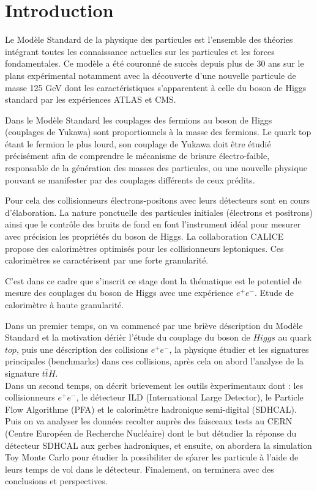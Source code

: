 \section*{Introduction} %

Le Mod\`ele Standard de la physique des particules est l’ensemble des th\'eories int\'egrant toutes les connaissance actuelles sur les particules et les forces fondamentales. Ce mod\`ele a \'et\'e couronn\'e de succ\`es depuis plus de 30 ans sur le plans exp\'erimental notamment avec la d\'ecouverte d'une nouvelle particule de masse 125 GeV dont les caract\'eristiques s'apparentent \`a celle du boson de Higgs standard par les exp\'eriences ATLAS et CMS.
~\par Dans le Mod\`ele Standard les couplages des fermions au boson de Higgs (couplages de Yukawa) sont proportionnels \`a la masse des fermions. Le quark top \'etant le fermion le plus lourd, son couplage de Yukawa doit \^etre \'etudi\'e pr\'ecis\'ement afin de comprendre le m\'ecanisme de brisure \'electro-faible, responsable de la g\'en\'eration des masses des particules, ou une nouvelle physique pouvant se manifester par des couplages diff\'erents de ceux pr\'edits. 
~\par Pour cela des collisionneurs \'electrons-positons avec leurs d\'etecteurs sont en cours d’\'elaboration. La nature ponctuelle des particules initiales (\'electrons et positrons) ainsi que le contr\^ole des bruits de fond en font l’instrument id\'eal pour mesurer avec pr\'ecision les propri\'et\'es du boson de Higgs. La collaboration CALICE propose des calorim\`etres optimis\'es pour les collisionneurs leptoniques. Ces calorim\`etres se caract\'erisent par une forte granularit\'e.
~\par C'est dans ce cadre que s'inscrit ce stage dont la th\'ematique est le potentiel de mesure des couplages du boson de Higgs avec une exp\'erience $e^{+}e^{-}$. Etude de calorim\`etre \`a haute granularit\'e. 
~\par Dans un premier temps, on va commenc\'e par une bri\`eve d\'escription du Mod\`ele Standard et la motivation d\'eri\`er l'\'etude du couplage du boson de $Higgs$ au quark $top$, puis une d\'escription des collisions $e^{+}e^{-}$, la physique \'etudier et les signatures principales (benchmarks) dans ces collisions, apr\`es cela on abord l'analyse de la signature $t\bar{t}H$.\\
Dans un second temps, on d\'ecrit brievement les outils \`experimentaux dont : les collisionneurs $e^+e^-$, le d\'etecteur ILD (International Large Detector), le Particle Flow Algorithme (PFA) et le calorim\`etre hadronique semi-digital (SDHCAL). Puis on va analyser les donn\'ees recolter aupr\`es des faisceaux tests au CERN (Centre Europ\'een de Recherche Nucl\'eaire) dont le but d\'etudier la r\'eponse du d\'etecteur SDHCAL aux gerbes hadroniques, et ensuite, on abordera la simulation Toy Monte Carlo pour \'etudier la possibiliter de s\'parer les particule \`a l'aide de leurs temps de vol dans le d\'etecteur. Finalement, on terminera avec des conclusions et perspectives.